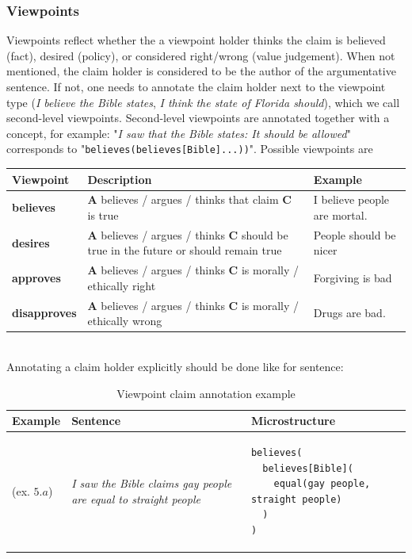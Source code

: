 \subsubsection*{Viewpoints}

Viewpoints reflect whether the a viewpoint holder thinks the claim is believed
(fact), desired (policy), or considered right/wrong (value judgement). When not
mentioned, the claim holder is considered to be the author of the argumentative
sentence. If not, one needs to annotate the claim holder next to the viewpoint
type (\textit{I believe the Bible states}, \textit{I think the state of Florida should}), which
we call second-level viewpoints. Second-level viewpoints are annotated together
with a concept, for example: "\textit{I saw that the Bible states: It should be
allowed}" corresponds to "\texttt{believes(believes[Bible]...))}".
Possible viewpoints are \\

\begin{tabular}{l p{7cm} p{6cm}}
\toprule
Viewpoint & Description & Example \\
\midrule
\textbf{believes} & \textbf{A} believes / argues / thinks
that claim \textbf{C} is true & 
I believe people are mortal. \\
\midrule
\textbf{desires} & 
\textbf{A} believes / argues / thinks \textbf{C} 
should be true in the future or should remain true
& People should be nicer \\
\midrule
\textbf{approves} & 
\textbf{A} believes / argues / thinks \textbf{C} 
is morally / ethically right & Forgiving is bad \\
\midrule
\textbf{disapproves} & 
\textbf{A} believes / argues / thinks \textbf{C} 
is morally / ethically wrong & 
Drugs are bad.  \\
\bottomrule
\end{tabular} \\

\noindent Annotating a claim holder explicitly should be done like for sentence:

\begin{table}[h]
\begin{tabular}{@{}m{1.5cm} m{5cm} m{8cm}}
\toprule
Example & Sentence & Microstructure \\
\midrule
(ex. $5.a$) & \textit{I saw the Bible claims gay people are equal to straight people} & 
\begin{verbatim}
believes(
  believes[Bible](
    equal(gay people, straight people)
  )
)
\end{verbatim}
\\
\bottomrule
\end{tabular}
\label{tab:viewpoint_example}
\caption{Viewpoint claim annotation example}
\end{table}

